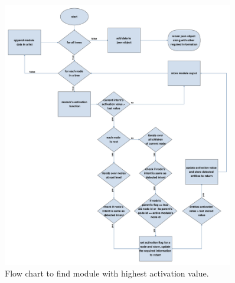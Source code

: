 \begin{figure}[!h]
    \centering
    \includegraphics[width=0.9\textwidth]{img/Dialogue_manager_updated.pdf}
    \caption{Flow chart to find module with highest activation value.}
    \label{fig:flowDialogueMan}
\end{figure}

